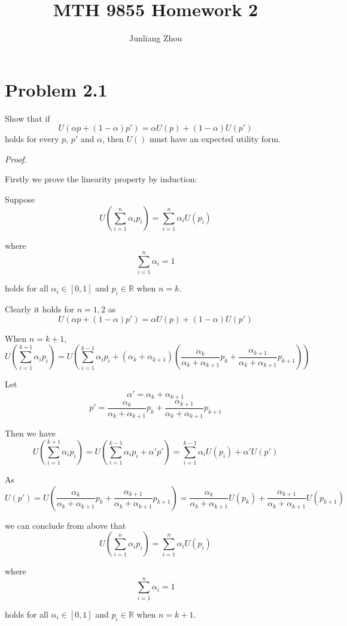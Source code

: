 \documentclass[a4paper]{article}
\title{MTH 9855 Homework 2}
\author{Junliang Zhou}
\begin{document}
\maketitle

\section{Problem 2.1}

Show that if 
\[U(\alpha p+(1-\alpha)p')=\alpha U(p)+(1-\alpha)U(p')\]
holds for every $p$, $p'$ and $\alpha$, then $U()$ must have an expected utility form.\newline

\textit{Proof.}\newline

Firstly we prove the linearity property by induction:\newline

Suppose
\[U(\sum_{i=1}^n {\alpha_i p_i}) = \sum_{i=1}^n {\alpha_i U(p_i)}\]

where
\[\sum_{i=1}^n {\alpha_i}=1\]

holds for all $\alpha_i\in[0,1]$ and $p_i\in\mathbb{R}$ when $n=k$.\newline

Clearly it holds for $n=1,2$ as
\[U(\alpha p+(1-\alpha)p')=\alpha U(p)+(1-\alpha)U(p')\]

When $n=k+1$, 
\[U(\sum_{i=1}^{k+1} {\alpha_i p_i}) = U(\sum_{i=1}^{k-1} {\alpha_i p_i}+(\alpha_k+\alpha_{k+1}) (\frac{\alpha_k}{\alpha_k+\alpha_{k+1}} p_k+\frac{\alpha_{k+1}}{\alpha_k+\alpha_{k+1}} p_{k+1}))\]

Let
\[\alpha'=\alpha_k+\alpha_{k+1}\]
\[p'=\frac{\alpha_k}{\alpha_k+\alpha_{k+1}} p_k+\frac{\alpha_{k+1}}{\alpha_k+\alpha_{k+1}} p_{k+1}\]

Then we have
\[U(\sum_{i=1}^{k+1} {\alpha_i p_i}) = U(\sum_{i=1}^{k-1} {\alpha_i p_i}+\alpha'p') = \sum_{i=1}^{k-1} {\alpha_i U(p_i)} + \alpha'U(p')\]

As
\[U(p')=U(\frac{\alpha_k}{\alpha_k+\alpha_{k+1}} p_k+\frac{\alpha_{k+1}}{\alpha_k+\alpha_{k+1}} p_{k+1})=\frac{\alpha_k}{\alpha_k+\alpha_{k+1}} U(p_k)+\frac{\alpha_{k+1}}{\alpha_k+\alpha_{k+1}} U(p_{k+1})\]

we can conclude from above that
\[U(\sum_{i=1}^n {\alpha_i p_i}) = \sum_{i=1}^n {\alpha_i U(p_i)}\]

where
\[\sum_{i=1}^n {\alpha_i}=1\]

holds for all $\alpha_i\in[0,1]$ and $p_i\in\mathbb{R}$ when $n=k+1$.\newline
\end{document}

